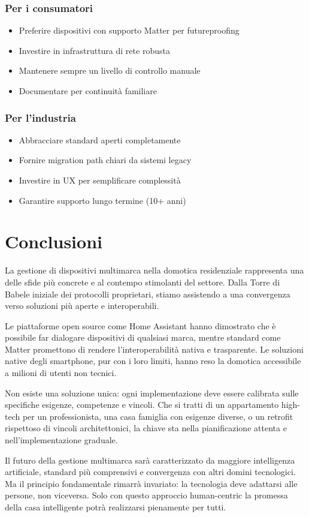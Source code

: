 \subsubsection{Per i consumatori}

\begin{itemize}
    \item Preferire dispositivi con supporto Matter per futureproofing
    \item Investire in infrastruttura di rete robusta
    \item Mantenere sempre un livello di controllo manuale
    \item Documentare per continuità familiare
\end{itemize}

\subsubsection{Per l'industria}

\begin{itemize}
    \item Abbracciare standard aperti completamente
    \item Fornire migration path chiari da sistemi legacy
    \item Investire in UX per semplificare complessità
    \item Garantire supporto lungo termine (10+ anni)
\end{itemize}

\section{Conclusioni}

La gestione di dispositivi multimarca nella domotica residenziale rappresenta una delle sfide più concrete e al contempo stimolanti del settore. Dalla Torre di Babele iniziale dei protocolli proprietari, stiamo assistendo a una convergenza verso soluzioni più aperte e interoperabili.

Le piattaforme open source come Home Assistant hanno dimostrato che è possibile far dialogare dispositivi di qualsiasi marca, mentre standard come Matter promettono di rendere l'interoperabilità nativa e trasparente. Le soluzioni native degli smartphone, pur con i loro limiti, hanno reso la domotica accessibile a milioni di utenti non tecnici.

Non esiste una soluzione unica: ogni implementazione deve essere calibrata sulle specifiche esigenze, competenze e vincoli. Che si tratti di un appartamento high-tech per un professionista, una casa famiglia con esigenze diverse, o un retrofit rispettoso di vincoli architettonici, la chiave sta nella pianificazione attenta e nell'implementazione graduale.

Il futuro della gestione multimarca sarà caratterizzato da maggiore intelligenza artificiale, standard più comprensivi e convergenza con altri domini tecnologici. Ma il principio fondamentale rimarrà invariato: la tecnologia deve adattarsi alle persone, non viceversa. Solo con questo approccio human-centric la promessa della casa intelligente potrà realizzarsi pienamente per tutti.